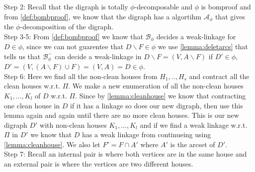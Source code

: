     Step 2: Recall that the digraph is totally $\phi$-decomposable and $\phi$ is bomproof and from \autoref{def:bombproof}, we know that the digraph has a algortihm $\mathcal{A}_{\phi}$ that gives the $\phi$-decomposition of the digraph. \\

    Step 3-5: From \autoref{def:bombproof} we know that $\mathcal{B}_{\phi}$ decides a weak-linkage for $D\in \phi$, since we can not guarentee that $D\backslash F \in \phi$ we use \autoref{lemma:deletarcs} that tells us that $\mathcal{B}_{\phi}^-$ can decide a weak-linkage in $D\backslash F=(V,A\backslash F)$ if $D' \in \phi$, $D'=(V,(A\backslash F)\cup F)=(V,A)=D\in \phi$. \\

    Step 6: Here we find all the non-clean houses from $H_1,..,H_s$ and contract all the clean houses w.r.t. $\Pi$. 
    We make a new enumeration of all the non-clean houses $K_1,\dots ,K_l$ of $D$ w.r.t. $\Pi$.
    Since by \autoref{lemma:cleanhouse} we know that contracting one clean house in $D$ if it has a linkage so does our new digraph, then use this lemma again and again until there are no more clean houses.
    This is our new digraph $D'$ with non-clean houses $K_1,\dots,K_l$ and if we find a weak linkage w.r.t. $\Pi$ in $D'$ we know that $D$ has a weak linkage from continueing using \autoref{lemma:cleanhouse}.
    We also let $F'=F\cap A'$ where $A'$ is the arcset of $D'$.\\

    Step 7: Recall an internal pair is where both vertices are in the same house and an external pair is where the vertices are two different houses. 

